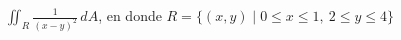 \item $\iint_R \frac{1}{(x - y)^2} \, dA$, en donde $R = \{(x, y) \mid 0 \le x \le 1, \ 2 \le y \le 4\}$
